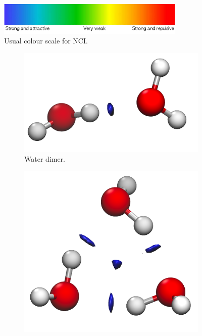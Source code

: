 \begin{figure}[h!]
  \centering
  \includegraphics[width=0.8\textwidth]{4/plots/nci/escalita_NCI_colorines.png}
  \caption{Usual colour scale for NCI.}
\label{escala_deColorines}
\end{figure}

\begin{figure}[h!]
  \centering
  \begin{subfigure}[b]{0.32\linewidth}
    \includegraphics[width=\linewidth]{4/plots/nci/new/dimeroNCI}
    \caption{Water dimer.}
  \end{subfigure}
  \begin{subfigure}[b]{0.32\linewidth}
    \includegraphics[width=\linewidth]{4/plots/nci/new/trimer}

\end{subfigure}
\end{figure}
